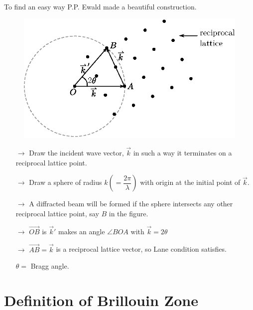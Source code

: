 To find an easy way P.P. Ewald made a beautiful construction.
\begin{figure}[H]
\centering
\includegraphics{images/lecture14/fig7.eps}
\end{figure}
\begin{itemize}
\item[$\to$] Draw the incident wave vector, $\overrightarrow{k}$ in such a way it terminates on a reciprocal lattice point.

\item[$\to$] Draw a sphere of radius $k\left(=\dfrac{2\pi}{\lambda}\right)$ with origin at the initial point of $\overrightarrow{k}$.

\item[$\to$] A diffracted beam will be formed if the sphere intersects any other reciprocal lattice point, say $B$ in the figure. 

\item[$\to$] $\overrightarrow{OB}$ is $\overrightarrow{k}'$ makes an angle $\angle{BOA}$ with $\overrightarrow{k}=2\theta$

\item[$\to$] $\overrightarrow{AB}=\overrightarrow{k}$ is a reciprocal lattice vector, so Lane condition satisfies.

\quad $\theta=$ Bragg angle.
\end{itemize}

\section*{Definition of Brillouin Zone}

